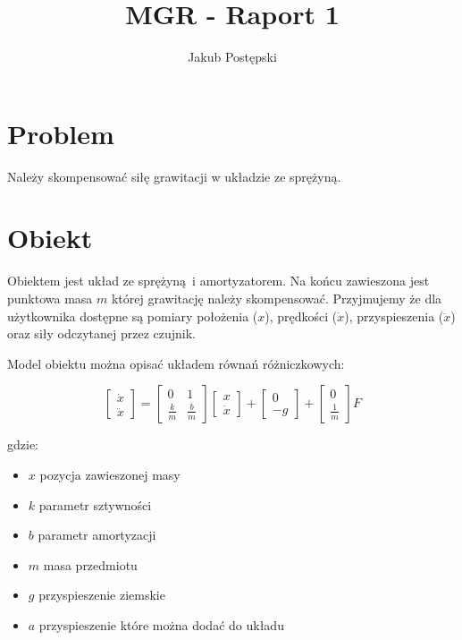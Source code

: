 \documentclass[a4paper]{article}
\title{MGR - Raport 1}
\author{Jakub Postępski}
\begin{document}
\maketitle

\section{Problem}
Należy skompensować siłę grawitacji w układzie ze sprężyną.

\section{Obiekt}
Obiektem jest układ ze sprężyną i amortyzatorem. Na końcu zawieszona jest punktowa masa $m$ której grawitację należy skompensować. Przyjmujemy że dla użytkownika dostępne są pomiary położenia ($x$), prędkości ($\dot{x}$), przyspieszenia ($\ddot{x}$) oraz siły odczytanej przez czujnik.

Model obiektu można opisać układem równań różniczkowych:

\[
\begin{bmatrix}
    \dot{x} \\
    \ddot{x}
\end{bmatrix}
=
\begin{bmatrix}
    0 & 1 \\
    \frac{k}{m} & \frac{b}{m}
\end{bmatrix}
\begin{bmatrix}
	x \\
    \dot{x}
\end{bmatrix}
+
\begin{bmatrix}
    0 \\
    -g
\end{bmatrix}
+
\begin{bmatrix}
    0\\
    \frac{1}{m}
\end{bmatrix}F
\]

gdzie:
\begin{itemize}
	\item $x$ pozycja zawieszonej masy
	\item $k$ parametr sztywności
	\item $b$ parametr amortyzacji
	\item $m$ masa przedmiotu
	\item $g$ przyspieszenie ziemskie
	\item $a$ przyspieszenie które można dodać do układu
\end{itemize}
\end{document}
